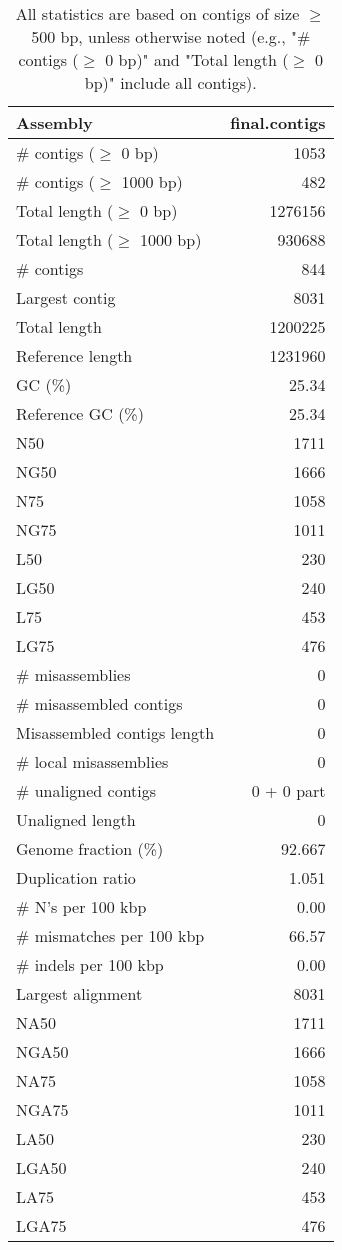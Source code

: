 \documentclass[12pt,a4paper]{article}
\begin{document}
\begin{table}[ht]
\begin{center}
\caption{All statistics are based on contigs of size $\geq$ 500 bp, unless otherwise noted (e.g., "\# contigs ($\geq$ 0 bp)" and "Total length ($\geq$ 0 bp)" include all contigs).}
\begin{tabular}{|l*{1}{|r}|}
\hline
Assembly & final.contigs \\ \hline
\# contigs ($\geq$ 0 bp) & 1053 \\ \hline
\# contigs ($\geq$ 1000 bp) & 482 \\ \hline
Total length ($\geq$ 0 bp) & 1276156 \\ \hline
Total length ($\geq$ 1000 bp) & 930688 \\ \hline
\# contigs & 844 \\ \hline
Largest contig & 8031 \\ \hline
Total length & 1200225 \\ \hline
Reference length & 1231960 \\ \hline
GC (\%) & 25.34 \\ \hline
Reference GC (\%) & 25.34 \\ \hline
N50 & 1711 \\ \hline
NG50 & 1666 \\ \hline
N75 & 1058 \\ \hline
NG75 & 1011 \\ \hline
L50 & 230 \\ \hline
LG50 & 240 \\ \hline
L75 & 453 \\ \hline
LG75 & 476 \\ \hline
\# misassemblies & 0 \\ \hline
\# misassembled contigs & 0 \\ \hline
Misassembled contigs length & 0 \\ \hline
\# local misassemblies & 0 \\ \hline
\# unaligned contigs & 0 + 0 part \\ \hline
Unaligned length & 0 \\ \hline
Genome fraction (\%) & 92.667 \\ \hline
Duplication ratio & 1.051 \\ \hline
\# N's per 100 kbp & 0.00 \\ \hline
\# mismatches per 100 kbp & 66.57 \\ \hline
\# indels per 100 kbp & 0.00 \\ \hline
Largest alignment & 8031 \\ \hline
NA50 & 1711 \\ \hline
NGA50 & 1666 \\ \hline
NA75 & 1058 \\ \hline
NGA75 & 1011 \\ \hline
LA50 & 230 \\ \hline
LGA50 & 240 \\ \hline
LA75 & 453 \\ \hline
LGA75 & 476 \\ \hline
\end{tabular}
\end{center}
\end{table}
\end{document}
